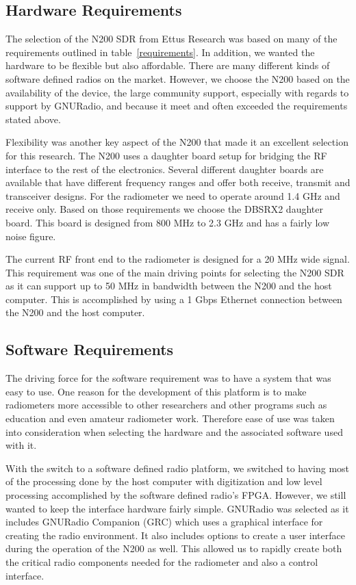 \subsection{Hardware Requirements}

The selection of the N200 SDR from Ettus Research was based on many of the requirements outlined in table~\ref{requirements}.  In addition, we wanted the hardware to be flexible but also affordable.  There are many different kinds of software defined radios on the market.  However, we choose the N200 based on the availability of the device, the large community support, especially with regards to support by GNURadio, and because it meet and often exceeded the requirements stated above.  

Flexibility was another key aspect of the N200 that made it an excellent selection for this research.  The N200 uses a daughter board setup for bridging the RF interface to the rest of the electronics.  Several different daughter boards are available that have different frequency ranges and offer both receive, transmit and transceiver designs.  For the radiometer we need to operate around 1.4 GHz and receive only.  Based on those requirements we choose the DBSRX2 daughter board.  This board is designed from 800 MHz to 2.3 GHz and has a fairly low noise figure.   

The current RF front end to the radiometer is designed for a 20 MHz wide signal.  This requirement was one of the main driving points for selecting the N200 SDR as it can support up to 50 MHz in bandwidth between the N200 and the host computer.  This is accomplished by using a 1 Gbps Ethernet connection between the N200 and the host computer.

\subsection{Software Requirements}

The driving force for the software requirement was to have a system that was easy to use.  One reason for the development of this platform is to make radiometers more accessible to other researchers and other programs such as education and even amateur radiometer work.  Therefore ease of use was taken into consideration when selecting the hardware and the associated software used with it.

With the switch to a software defined radio platform, we switched to having most of the processing done by the host computer with digitization and low level processing accomplished by the software defined radio's FPGA.  However, we still wanted to keep the interface hardware fairly simple.  GNURadio was selected as it includes GNURadio Companion (GRC) which uses a graphical interface for creating the radio environment.  It also includes options to create a user interface during the operation of the N200 as well.  This allowed us to rapidly create both the critical radio components needed for the radiometer and also a control interface.

